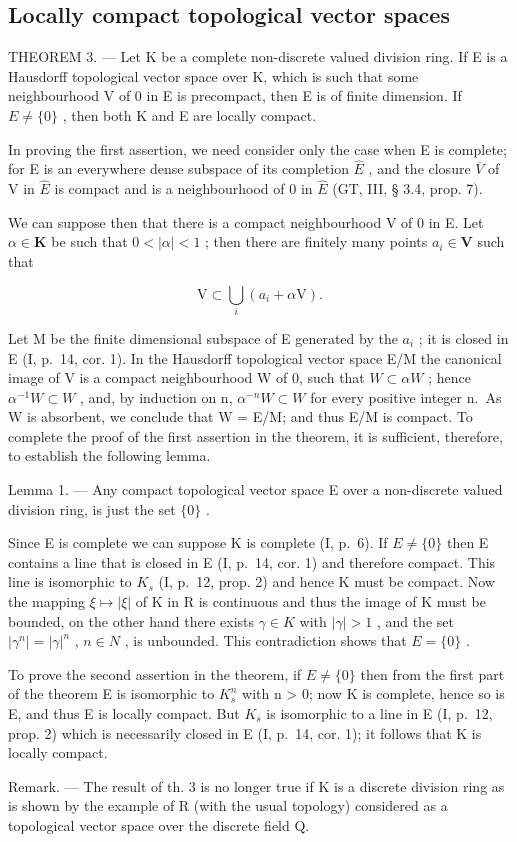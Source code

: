 \subsection{Locally compact topological vector spaces}

THEOREM 3. --- Let K be a complete non-discrete valued division ring. If E is a Hausdorff topological vector space over K, which is such that some neighbourhood V of 0 in E is precompact, then E is of finite dimension. If \(E \neq \{0\}\) , then both K and E are locally compact.

In proving the first assertion, we need consider only the case when E is complete; for E is an everywhere dense subspace of its completion \(\hat{E}\) , and the closure \(\overline{V}\) of V in \(\hat{E}\) is compact and is a neighbourhood of 0 in \(\hat{E}\) (GT, III, § 3.4, prop. 7).

We can suppose then that there is a compact neighbourhood V of 0 in E. Let \(\alpha \in \mathbf{K}\) be such that \(0 < |\alpha| < 1\) ; then there are finitely many points \(a_i \in \mathbf{V}\) such that

\[
\mathrm{V} \subset \bigcup_ {i} (a _ {i} + \alpha \mathrm{V}).
\]

Let M be the finite dimensional subspace of E generated by the \(a_{i}\) ; it is closed in E (I, p.~14, cor. 1). In the Hausdorff topological vector space E/M the canonical image of V is a compact neighbourhood W of 0, such that \(W \subset \alpha W\) ; hence \(\alpha^{-1} W \subset W\) , and, by induction on n, \(\alpha^{-n} W \subset W\) for every positive integer n.~As W is absorbent, we conclude that W = E/M; and thus E/M is compact. To complete the proof of the first assertion in the theorem, it is sufficient, therefore, to establish the following lemma.

Lemma 1. --- Any compact topological vector space E over a non-discrete valued division ring, is just the set \(\{0\}\) .

Since E is complete we can suppose K is complete (I, p.~6). If \(E \neq \{0\}\) then E contains a line that is closed in E (I, p.~14, cor. 1) and therefore compact. This line is isomorphic to \(K_{s}\) (I, p.~12, prop. 2) and hence K must be compact. Now the mapping \(\xi \mapsto |\xi|\) of K in R is continuous and thus the image of K must be bounded, on the other hand there exists \(\gamma \in K\) with \(|\gamma| > 1\) , and the set \(|\gamma^{n}| = |\gamma|^{n}\) , \(n \in N\) , is unbounded. This contradiction shows that \(E = \{0\}\) .

To prove the second assertion in the theorem, if \(E \neq \{0\}\) then from the first part of the theorem E is isomorphic to \(K_{s}^{n}\) with n \textgreater{} 0; now K is complete, hence so is E, and thus E is locally compact. But \(K_{s}\) is isomorphic to a line in E (I, p.~12, prop. 2) which is necessarily closed in E (I, p.~14, cor. 1); it follows that K is locally compact.

Remark. --- The result of th. 3 is no longer true if K is a discrete division ring as is shown by the example of R (with the usual topology) considered as a topological vector space over the discrete field Q.

